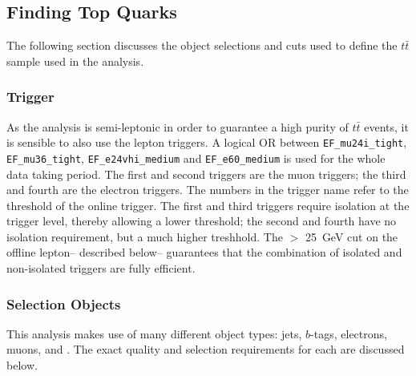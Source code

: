 	\subsection{Finding Top Quarks}

	The following section discusses the object selections and cuts used to define the $t\bar{t}$ sample used in the analysis.

	\subsubsection{Trigger}

	As the analysis is semi-leptonic in order to guarantee a high purity of $t\bar{t}$ events, it is sensible to also use the lepton triggers. A logical OR between {\tt EF\_mu24i\_tight}, {\tt EF\_mu36\_tight}, {\tt EF\_e24vhi\_medium} and {\tt EF\_e60\_medium} is used for the whole data taking period. The first and second triggers are the muon triggers; the third and fourth are the electron triggers. The numbers in the trigger name refer to the \pt threshold of the online trigger. The first and third triggers require isolation at the trigger level, thereby allowing a lower \pt threshold; the second and fourth have no isolation requirement, but a much higher \pt treshhold. The \pt $>$ 25~GeV cut on the offline lepton-- described below-- guarantees that the combination of isolated and non-isolated triggers are fully efficient.

	\subsubsection{Selection Objects}

	This analysis makes use of many different object types: jets, $b$-tags, electrons, muons, and \met. The exact quality and selection requirements for each are discussed below.

